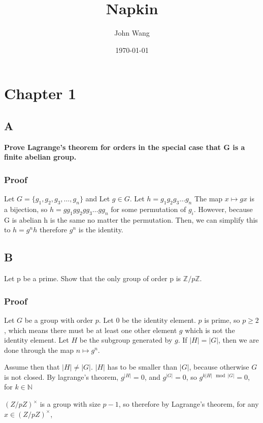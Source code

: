 \documentclass[11pt]{article}
\author{John Wang}
\date{\today}
\title{Napkin}
\begin{document}
\maketitle
\tableofcontents

\section{Chapter 1}
\label{sec:orgf50ce7f}
\subsection{A}
\label{sec:orga2cd312}
\textbf{Prove Lagrange’s theorem for orders in the special case that G is a finite abelian group.}


\subsubsection{Proof}
\label{sec:org07ad5d4}
Let \(G = \{g_1, g_2, g_3, \dots, g_n\}\) and
Let \(g \in G\). Let \(h = g_1g_2g_3\dots g_n\)  The map \(x \mapsto gx\) is a bijection,
so \(h = g g_1 g g_2 g g_3 \dots g g_n\) for some permutation of \(g_i\).  However,  because G is abelian
h is the same no matter the permutation.  Then, we can simplify this to
\(h = g^n h\) therefore \(g^n\) is the identity.

\subsection{B}
\label{sec:org83593a2}
Let p be a prime. Show that the only group of order p is \(\mathbb{Z}/p \mathbb{Z}\).


\subsubsection{Proof}
\label{sec:org5b3735e}
Let \(G\) be a group with order \(p\). Let \(0\) be the identity element. \(p\) is prime, so \(p \ge 2\), which means there must
be at least one other element \(g\) which is not the identity element. Let \(H\) be the subgroup
generated by \(g\). If \(|H| = |G|\), then we are done through the map \(n \mapsto g^n\).

Assume then that \(|H| \ne |G|\). \(|H|\) has to be smaller than \(|G|\), because otherwise \(G\) is not closed.
By lagrange's theorem,  \(g^{|H|} = 0\), and \(g^{|G|} = 0\), so \(g ^{k |H| \mod |G|} = 0\), for \(k \in \mathbb{N}\)


\((Z / pZ)^{\times}\) is a group with size \(p - 1\), so therefore by Lagrange's theorem, for any
\(x \in (Z / pZ)^{\times}\),
\end{document}
